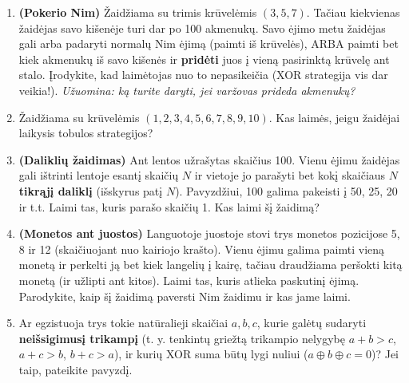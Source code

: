 \documentclass[11pt,a4paper]{scrartcl}
\begin{document}
\begin{enumerate}
    \item \textbf{(Pokerio Nim)} Žaidžiama su trimis krūvelėmis $(3, 5, 7)$. Tačiau kiekvienas žaidėjas savo kišenėje turi dar po 100 akmenukų. Savo ėjimo metu žaidėjas gali arba padaryti normalų Nim ėjimą (paimti iš krūvelės), ARBA paimti bet kiek akmenukų iš savo kišenės ir \textbf{pridėti} juos į vieną pasirinktą krūvelę ant stalo. Įrodykite, kad laimėtojas nuo to nepasikeičia (XOR strategija vis dar veikia!). \textit{Užuomina: ką turite daryti, jei varžovas prideda akmenukų?}
    \item Žaidžiama su krūvelėmis $(1, 2, 3, 4, 5, 6, 7, 8, 9, 10)$. Kas laimės, jeigu žaidėjai laikysis tobulos strategijos?
    \item \textbf{(Daliklių žaidimas)} Ant lentos užrašytas skaičius 100. Vienu ėjimu žaidėjas gali ištrinti lentoje esantį skaičių $N$ ir vietoje jo parašyti bet kokį skaičiaus $N$ \textbf{tikrąjį daliklį} (išskyrus patį $N$). Pavyzdžiui, 100 galima pakeisti į 50, 25, 20 ir t.t. Laimi tas, kuris parašo skaičių 1. Kas laimi šį žaidimą?
    \item \textbf{(Monetos ant juostos)} Languotoje juostoje stovi trys monetos pozicijose 5, 8 ir 12 (skaičiuojant nuo kairiojo krašto). Vienu ėjimu galima paimti vieną monetą ir perkelti ją bet kiek langelių į kairę, tačiau draudžiama peršokti kitą monetą (ir užlipti ant kitos). Laimi tas, kuris atlieka paskutinį ėjimą. Parodykite, kaip šį žaidimą paversti Nim žaidimu ir kas jame laimi.
    \item Ar egzistuoja trys tokie natūralieji skaičiai $a, b, c$, kurie galėtų sudaryti \textbf{neišsigimusį trikampį} (t. y. tenkintų griežtą trikampio nelygybę $a+b>c$, $a+c>b$, $b+c>a$), ir kurių XOR suma būtų lygi nuliui ($a \oplus b \oplus c = 0$)? Jei taip, pateikite pavyzdį.
    

\end{enumerate}
\end{document}
